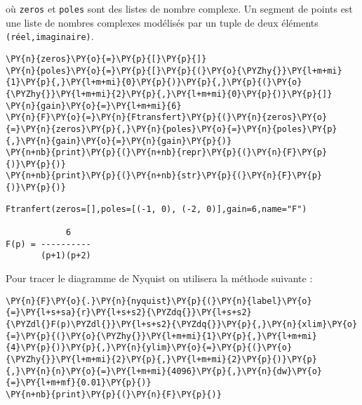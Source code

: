 où \texttt{zeros} et \texttt{poles} sont des listes de nombre complexe.
Un segment de points est une liste de nombres complexes modélisés par un
tuple de deux éléments \texttt{(réel,imaginaire)}.

    \begin{tcolorbox}[breakable, size=fbox, boxrule=1pt, pad at break*=1mm,colback=cellbackground, colframe=cellborder]
\begin{Verbatim}[commandchars=\\\{\}]
\PY{n}{zeros}\PY{o}{=}\PY{p}{[}\PY{p}{]}  
\PY{n}{poles}\PY{o}{=}\PY{p}{[}\PY{p}{(}\PY{o}{\PYZhy{}}\PY{l+m+mi}{1}\PY{p}{,}\PY{l+m+mi}{0}\PY{p}{)}\PY{p}{,}\PY{p}{(}\PY{o}{\PYZhy{}}\PY{l+m+mi}{2}\PY{p}{,}\PY{l+m+mi}{0}\PY{p}{)}\PY{p}{]}
\PY{n}{gain}\PY{o}{=}\PY{l+m+mi}{6}
\PY{n}{F}\PY{o}{=}\PY{n}{Ftransfert}\PY{p}{(}\PY{n}{zeros}\PY{o}{=}\PY{n}{zeros}\PY{p}{,}\PY{n}{poles}\PY{o}{=}\PY{n}{poles}\PY{p}{,}\PY{n}{gain}\PY{o}{=}\PY{n}{gain}\PY{p}{)}
\PY{n+nb}{print}\PY{p}{(}\PY{n+nb}{repr}\PY{p}{(}\PY{n}{F}\PY{p}{)}\PY{p}{)}
\PY{n+nb}{print}\PY{p}{(}\PY{n+nb}{str}\PY{p}{(}\PY{n}{F}\PY{p}{)}\PY{p}{)}
\end{Verbatim}
\end{tcolorbox}

    \begin{Verbatim}[commandchars=\\\{\}]
Ftranfert(zeros=[],poles=[(-1, 0), (-2, 0)],gain=6,name="F")

            6
F(p) = ----------
       (p+1)(p+2)

    \end{Verbatim}

    Pour tracer le diagramme de Nyquist on utilisera la méthode suivante :

    \begin{tcolorbox}[breakable, size=fbox, boxrule=1pt, pad at break*=1mm,colback=cellbackground, colframe=cellborder]
\begin{Verbatim}[commandchars=\\\{\}]
\PY{n}{F}\PY{o}{.}\PY{n}{nyquist}\PY{p}{(}\PY{n}{label}\PY{o}{=}\PY{l+s+sa}{r}\PY{l+s+s2}{\PYZdq{}}\PY{l+s+s2}{\PYZdl{}F(p)\PYZdl{}}\PY{l+s+s2}{\PYZdq{}}\PY{p}{,}\PY{n}{xlim}\PY{o}{=}\PY{p}{(}\PY{o}{\PYZhy{}}\PY{l+m+mi}{1}\PY{p}{,}\PY{l+m+mi}{4}\PY{p}{)}\PY{p}{,}\PY{n}{ylim}\PY{o}{=}\PY{p}{(}\PY{o}{\PYZhy{}}\PY{l+m+mi}{2}\PY{p}{,}\PY{l+m+mi}{2}\PY{p}{)}\PY{p}{,}\PY{n}{n}\PY{o}{=}\PY{l+m+mi}{4096}\PY{p}{,}\PY{n}{dw}\PY{o}{=}\PY{l+m+mf}{0.01}\PY{p}{)}
\PY{n+nb}{print}\PY{p}{(}\PY{n}{F}\PY{p}{)}
\end{Verbatim}
\end{tcolorbox}

